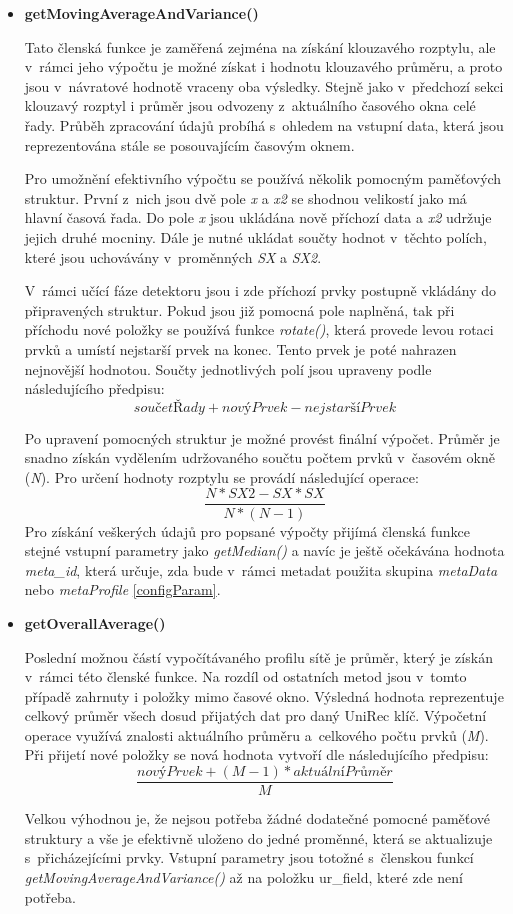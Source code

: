 \begin{itemize}
 \item \textbf{getMovingAverageAndVariance()}%
 
 Tato členská funkce je zaměřená zejména na získání klouzavého rozptylu, ale v~rámci jeho výpočtu je možné
 získat i hodnotu klouzavého průměru, a proto jsou v~návratové hodnotě vraceny oba výsledky.
 Stejně jako v~předchozí sekci klouzavý rozptyl i průměr jsou odvozeny z~aktuálního časového
 okna celé řady.
 Průběh
 zpracování údajů probíhá s~ohledem na vstupní data, která 
 jsou reprezentována stále se posouvajícím časovým oknem. 
 
 Pro umožnění efektivního výpočtu se používá několik pomocným paměťových struktur. První z~nich 
 jsou dvě pole \textit{x} a \textit{x2} se shodnou velikostí jako má hlavní časová řada. Do pole
 \textit{x} jsou ukládána
 nově příchozí data a \textit{x2} udržuje jejich druhé mocniny. Dále je nutné ukládat součty
 hodnot v~těchto polích, které jsou uchovávány v~proměnných \textit{SX} a \textit{SX2}.
 
 V~rámci učící fáze detektoru jsou i zde příchozí prvky postupně vkládány do připravených struktur.
 Pokud jsou již pomocná pole naplněná, tak při příchodu nové položky se používá funkce
 \textit{rotate()}, která provede levou rotaci prvků a umístí nejstarší prvek na konec. Tento
 prvek je poté nahrazen nejnovější hodnotou. Součty jednotlivých polí jsou upraveny podle 
 následujícího předpisu:  
 \[
  součetŘady + novýPrvek - nejstaršíPrvek
\]
 
 Po upravení pomocných struktur je možné provést finální výpočet. Průměr je snadno získán vydělením
 udržovaného součtu počtem prvků v~časovém okně (\textit{N}). Pro určení hodnoty rozptylu se provádí
 následující operace:
\[
   \frac{N * SX2 - SX * SX}{N * (N - 1)}
\]
Pro získání veškerých údajů pro popsané výpočty přijímá členská funkce stejné vstupní parametry
jako \textit{getMedian()} a navíc je ještě očekávána hodnota \textit{meta\_id}, která určuje, 
zda bude v~rámci metadat použita skupina \textit{metaData} nebo \textit{metaProfile} \ref{configParam}. 

 \item \textbf{getOverallAverage()}%
 
 Poslední možnou částí vypočítávaného profilu sítě je průměr, který je získán v~rámci 
 této členské funkce. Na rozdíl od ostatních metod jsou v~tomto případě zahrnuty i položky 
 mimo časové okno. Výsledná hodnota reprezentuje celkový průměr všech dosud přijatých dat pro 
 daný UniRec klíč. Výpočetní operace využívá znalosti aktuálního průměru a~celkového počtu prvků
 (\textit{M}). Při přijetí 
 nové položky se nová hodnota vytvoří dle následujícího předpisu:
 \[
   \frac{novýPrvek + (M - 1) * aktuálníPrůměr}{M}
\]
 
 
 Velkou výhodnou je, že nejsou potřeba žádné dodatečné pomocné paměťové struktury a vše je 
 efektivně uloženo do jedné proměnné, která se aktualizuje s~přicházejícími prvky. Vstupní
 parametry jsou totožné s~členskou funkcí \textit{getMovingAverageAndVariance()} až na položku
 {ur\_field}, které zde není potřeba.
\end{itemize}

